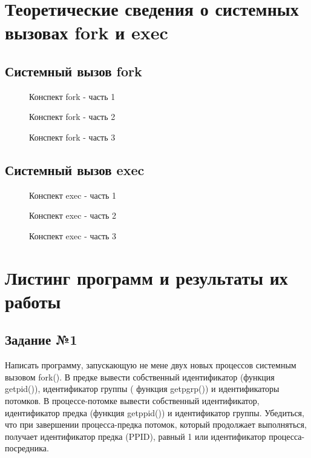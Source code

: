 \chapter{Теоретические сведения о системных вызовах fork и exec}

\section{Системный вызов fork}

\begin{figure}[ph!]
	\caption{Конспект fork - часть 1}
\end{figure}

\begin{figure}[ph!]
	\caption{Конспект fork - часть 2}
\end{figure}

\newpage

\begin{figure}[ph!]
	\caption{Конспект fork - часть 3}
\end{figure}

\section{Системный вызов exec}

\begin{figure}[ph!]
	\caption{Конспект exec - часть 1}
\end{figure}

\begin{figure}[ph!]
	\caption{Конспект exec - часть 2}
\end{figure}

\begin{figure}[ph!]
	\caption{Конспект exec - часть 3}
\end{figure}

\chapter{Листинг программ и результаты их работы}
\section{Задание №1}
Написать программу, запускающую не мене двух новых процессов системным вызовом fork(). В предке вывести собственный идентификатор (функция getpid()), идентификатор группы ( функция getpgrp())  и идентификаторы потомков. В процессе-потомке вывести собственный идентификатор, идентификатор предка (функция getppid()) и идентификатор группы. Убедиться, что при завершении процесса-предка потомок, который продолжает выполняться, получает идентификатор предка (PPID), равный 1 или идентификатор процесса-посредника.

